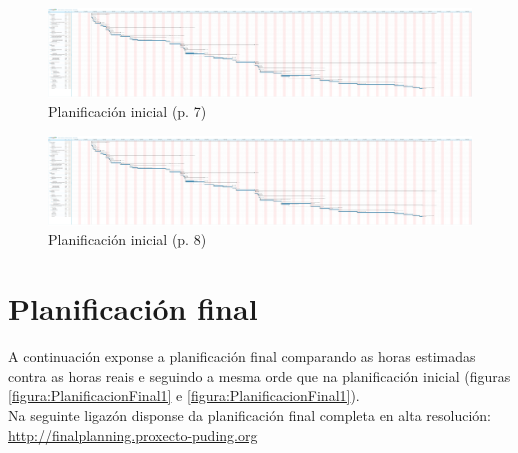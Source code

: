 \begin{figure}
 \centering
 \includegraphics[trim=189cm 5cm 21cm 0,clip=true,scale=0.45,keepaspectratio=true]{./imagenes/planificacion-inicial.png}
 \caption{Planificación inicial (p. 7)}
 \label{figura:PlanificacionInicialCompleta7}
\end{figure}

\begin{figure}
 \centering
 \includegraphics[trim=221cm 5cm 0 0,clip=true,scale=0.45,keepaspectratio=true]{./imagenes/planificacion-inicial.png}
 \caption{Planificación inicial (p. 8)}
 \label{figura:PlanificacionInicialCompleta8}
\end{figure}

\section{Planificación final}

A continuación exponse a planificación final comparando as horas estimadas
contra as horas reais e seguindo a mesma orde que na planificación inicial
(figuras \ref{figura:PlanificacionFinal1} e \ref{figura:PlanificacionFinal1}). \\

Na seguinte ligazón disponse da planificación final completa en alta
resolución: \\

\url{http://finalplanning.proxecto-puding.org} \\

